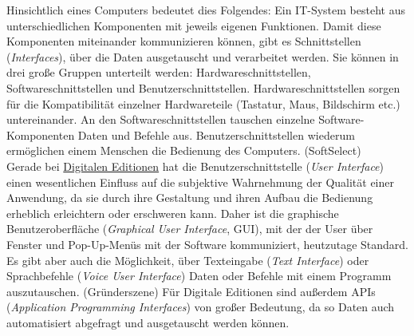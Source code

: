 \documentclass{article}
\begin{document}
        Hinsichtlich eines Computers bedeutet dies Folgendes: Ein IT-System besteht aus
                  unterschiedlichen Komponenten mit jeweils eigenen Funktionen. Damit diese
                  Komponenten miteinander kommunizieren können, gibt es Schnittstellen (\emph{Interfaces}), über die Daten ausgetauscht und verarbeitet
                  werden. Sie können in drei große Gruppen unterteilt werden:
                  Hardwareschnittstellen, Softwareschnittstellen und Benutzerschnittstellen.
                  Hardwareschnittstellen sorgen für die Kompatibilität einzelner Hardwareteile
                  (Tastatur, Maus, Bildschirm etc.) untereinander. An den Softwareschnittstellen
                  tauschen einzelne Software-Komponenten Daten und Befehle aus.
                  Benutzerschnittstellen wiederum ermöglichen einem Menschen die Bedienung des
                  Computers. (SoftSelect)\\
            
        Gerade bei \href{http://gams.uni-graz.at/o:konde.59}{Digitalen Editionen} hat
                  die Benutzerschnittstelle (\emph{User Interface}) einen
                  wesentlichen Einfluss auf die subjektive Wahrnehmung der Qualität einer Anwendung,
                  da sie durch ihre Gestaltung und ihren Aufbau die Bedienung erheblich erleichtern
                  oder erschweren kann. Daher ist die graphische Benutzeroberfläche (\emph{Graphical User Interface}, GUI), mit der der User über
                  Fenster und Pop-Up-Menüs mit der Software kommuniziert, heutzutage Standard. Es
                  gibt aber auch die Möglichkeit, über Texteingabe (\emph{Text
                     Interface}) oder Sprachbefehle (\emph{Voice User
                  Interface}) Daten oder Befehle mit einem Programm auszutauschen.
                     (Gründerszene) Für Digitale Editionen sind außerdem APIs (\emph{Application Programming Interfaces}) von großer Bedeutung, da
                  so Daten auch automatisiert abgefragt und ausgetauscht werden können.\\
            
\end{document}
